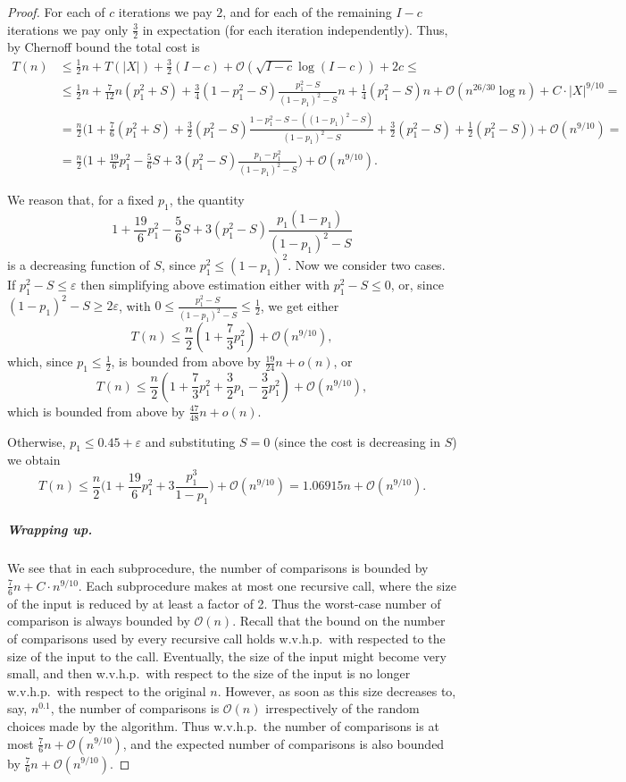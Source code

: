 \documentclass{article}[11pt,a4paper]
\newcommand{\bigo}{\mathcal{O}}
\begin{document}
\begin{proof}
For each of $c$ iterations we pay $2$, and for each of the remaining $I-c$ iterations we pay
only $\frac{3}{2}$ in expectation (for each iteration independently). Thus, by Chernoff bound
the total cost is
\begin{align*}
T(n) &\le \frac12n + T(|X|)+\frac32(I-c)+\bigo(\sqrt{I-c}\log (I-c))+2c \le \\[6pt]
& \le \frac12n + \frac{7}{12}n(p_1^2+S) + \frac{3}{4}(1-p_1^2-S)\frac{p_1^2-S}{(1-p_1)^2-S}n  +  \frac14(p_1^2-S)n + \bigo(n^{26/30}\log n)  + C \cdot |X|^{9/10} = \\[6pt]
& = \frac{n}{2}\biggl(1+\frac76(p_1^2+S)+\frac32 (p_1^2-S)\frac{1-p_1^2-S-((1-p_1)^2-S)}{(1-p_1)^2-S} + \frac32(p_1^2-S) + \frac12(p_1^2-S)\biggr)+ \bigo( n^{9/10}) =\\[6pt]
&= \frac{n}{2}\biggl(1+\frac{19}6p_1^2-\frac56S+3 (p_1^2-S)\frac{p_1-p_1^2}{(1-p_1)^2-S} \biggr)+ \bigo( n^{9/10}).
\end{align*}


We reason that, for a fixed $p_1$, the quantity \[1+\frac{19}{6}p_1^2-\frac{5}{6}S + 3 (p_1^2-S) \frac{p_1(1-p_1)}{(1-p_1)^2-S}\]  is a decreasing function of $S$, since $p_1^2 \le (1-p_1)^2$. Now we consider two cases. If $p_1^2 - S \le \varepsilon$ then  simplifying above estimation either with $p_1^2-S \le 0$, or, since $(1-p_1)^2-S \ge 2\varepsilon$, with $0 \le \frac{p_1^2-S}{(1-p_1)^2-S} \le \frac12$, we get either
\[T(n) \le \frac{n}{2}\left(1+\frac73p_1^2 \right) + \bigo(n^{9/10}), \]
which, since $p_1 \le \frac12$, is bounded from above by $\frac{19}{24}n + o(n)$, or
\[T(n) \le \frac{n}{2}\left(1+\frac73p_1^2 + \frac32p_1-\frac32p_1^2\right) + \bigo( n^{9/10}), \]
which is bounded from above by $\frac{47}{48}n+o(n)$.

Otherwise, $p_1 \le 0.45 + \varepsilon$ and substituting $S=0$ (since the cost is decreasing in $S$) we obtain
\[T(n) \le \frac{n}{2}\biggl(1+\frac{19}{6}p_1^2 + 3 \frac{p_1^3}{1-p_1}\biggr) + \bigo(n^{9/10}) = 1.06915 n + \bigo(n^{9/10}).\]

\subparagraph*{Wrapping up.}
We see that in each subprocedure, the number of comparisons is bounded by $\frac76n+C\cdot n^{9/10}$. 
Each subprocedure makes at most one recursive call, where the size of the input is reduced by at least
a factor of 2. Thus the worst-case number of comparison is always bounded by $\bigo(n)$.
Recall that the bound on the number of comparisons used by every recursive call holds
w.v.h.p.\ with respected to the size of the input to the call.
Eventually, the size of the input might become very small, and then w.v.h.p.\ with respect to the size
of the input is no longer w.v.h.p.\ with respect to the original $n$. However, as soon as this size
decreases to, say, $n^{0.1}$, the number of comparisons is $\bigo(n)$ irrespectively of the
random choices made by the algorithm. Thus w.v.h.p.\ the number of comparisons is at most
$\frac76n+\bigo(n^{9/10})$, and the expected number of comparisons is also bounded by
$\frac{7}{6}n + \bigo(n^{9/10})$.
\end{proof}
\end{document}
